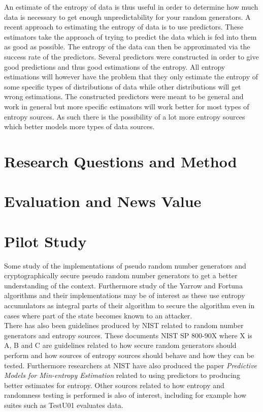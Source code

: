 \documentclass[a4paper,11pt]{report}
\begin{document}
\noindent
An estimate of the entropy of data is thus useful in order to determine
how much data is necessary to get enough unpredictability for your random
generators. A recent approach to estimating the entropy of data is to use 
predictors. These estimators take the approach of trying to predict the data
which is fed into them as good as possible. The entropy of the data can then
be approximated via the success rate of the predictors. Several predictors were
constructed in order to give good predictions and thus good estimations of the 
entropy. All entropy estimations will however have the problem that they only
estimate the entropy of some specific types of distributions of data while 
other distributions will get wrong estimations. The constructed predictors were 
meant to be general and work in general but more specific estimators will work
better for most types of entropy sources. As such there is the possibility of
a lot more entropy sources which better models more types of data sources.

\section*{Research Questions and Method}
\section*{Evaluation and News Value}
\section*{Pilot Study}
Some study of the implementations of pseudo random number generators and
cryptographically secure pseudo random number generators to get a better
understanding of the context. Furthermore study of the Yarrow and
Fortuna algorithms and their implementations may be of interest as these 
use entropy accumulators as integral parts of their algorithm to secure the 
algorithm even in cases where part of the state becomes known to an attacker.
\\

\noindent
There has also been guidelines produced by NIST related to random number
generators and entropy sources. These documents NIST SP 800-90X where 
X is A, B and C are guidelines related to how secure random generators 
should perform and how sources of entropy sources should behave and how
they can be tested. Furthermore researchers at NIST have also produced 
the paper \textit{Predictive Models for Min-entropy Estimation} related to 
using predictors to producing better estimates for entropy.
Other sources related to how entropy and randomness testing is performed is
also of interest, including for example how suites such as TestU01 evaluates
data.
\\
\end{document}
